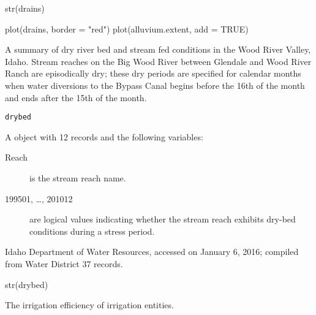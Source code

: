 \documentclass[a4paper]{book}
\begin{document}
%
\begin{Examples}
\begin{ExampleCode}
str(drains)

plot(drains, border = "red")
plot(alluvium.extent, add = TRUE)
\end{ExampleCode}
\end{Examples}
%
\begin{Description}\relax
A summary of dry river bed and stream fed conditions in the Wood River Valley, Idaho.
Stream reaches on the Big Wood River between Glendale and Wood River Ranch are episodically dry;
these dry periods are specified for calendar months when water diversions to the Bypass Canal begins before the 16th of the month and ends after the 15th of the month.
\end{Description}
%
\begin{Usage}
\begin{verbatim}
drybed
\end{verbatim}
\end{Usage}
%
\begin{Format}
A  object with 12 records and the following variables:
\begin{description}

\item[Reach] is the stream reach name.
\item[199501, \dots, 201012] are logical values indicating whether the stream reach exhibits dry-bed conditions during a stress period.

\end{description}

\end{Format}
%
\begin{Source}\relax
Idaho Department of Water Resources, accessed on January 6, 2016;
compiled from Water District 37 records.
\end{Source}
%
\begin{Examples}
\begin{ExampleCode}
str(drybed)
\end{ExampleCode}
\end{Examples}
%
\begin{Description}\relax
The irrigation efficiency of irrigation entities.
\end{Description}
\end{document}
